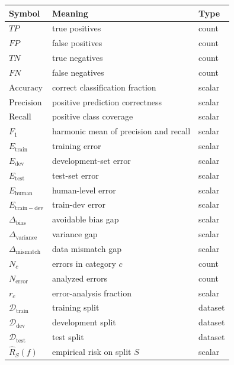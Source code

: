 \begin{center}
\begin{tabular}{lll}
\toprule
Symbol & Meaning & Type \\
\midrule
$TP$ & true positives & count \\
$FP$ & false positives & count \\
$TN$ & true negatives & count \\
$FN$ & false negatives & count \\
$\mathrm{Accuracy}$ & correct classification fraction & scalar \\
$\mathrm{Precision}$ & positive prediction correctness & scalar \\
$\mathrm{Recall}$ & positive class coverage & scalar \\
$F_1$ & harmonic mean of precision and recall & scalar \\
$E_{\mathrm{train}}$ & training error & scalar \\
$E_{\mathrm{dev}}$ & development-set error & scalar \\
$E_{\mathrm{test}}$ & test-set error & scalar \\
$E_{\mathrm{human}}$ & human-level error & scalar \\
$E_{\mathrm{train-dev}}$ & train-dev error & scalar \\
$\Delta_{\mathrm{bias}}$ & avoidable bias gap & scalar \\
$\Delta_{\mathrm{variance}}$ & variance gap & scalar \\
$\Delta_{\mathrm{mismatch}}$ & data mismatch gap & scalar \\
$N_c$ & errors in category $c$ & count \\
$N_{\mathrm{error}}$ & analyzed errors & count \\
$r_c$ & error-analysis fraction & scalar \\
$\mathcal{D}_{\mathrm{train}}$ & training split & dataset \\
$\mathcal{D}_{\mathrm{dev}}$ & development split & dataset \\
$\mathcal{D}_{\mathrm{test}}$ & test split & dataset \\
$\widehat{R}_S(f)$ & empirical risk on split $S$ & scalar \\
\bottomrule
\end{tabular}
\end{center}

